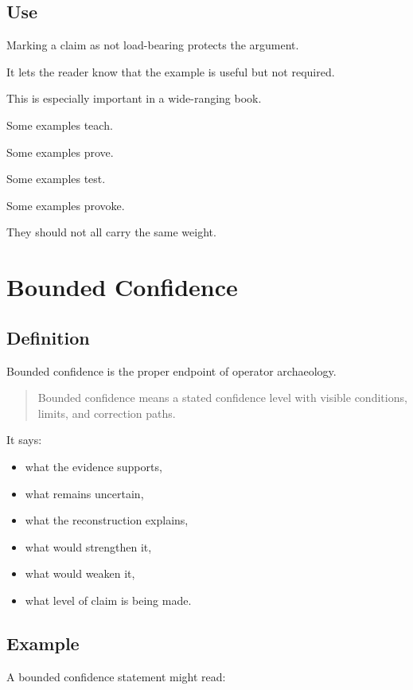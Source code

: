 \documentclass[11pt]{book}
\begin{document}
\subsection{Use}

Marking a claim as not load-bearing protects the argument.

It lets the reader know that the example is useful but not required.

This is especially important in a wide-ranging book.

Some examples teach.

Some examples prove.

Some examples test.

Some examples provoke.

They should not all carry the same weight.

\section{Bounded Confidence}

\subsection{Definition}

Bounded confidence is the proper endpoint of operator archaeology.

\begin{quote}
Bounded confidence means a stated confidence level with visible conditions, limits, and correction paths.
\end{quote}

It says:

\begin{itemize}
    \item what the evidence supports,
    \item what remains uncertain,
    \item what the reconstruction explains,
    \item what would strengthen it,
    \item what would weaken it,
    \item what level of claim is being made.
\end{itemize}

\subsection{Example}

A bounded confidence statement might read:
\end{document}
